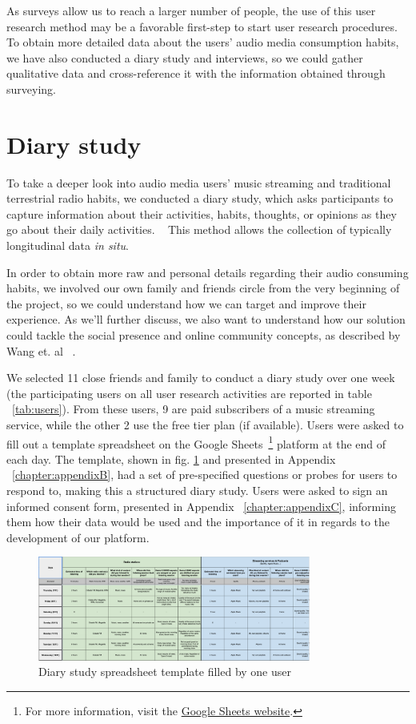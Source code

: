 As surveys allow us to reach a larger number of people, the use of this user research method may be a favorable first-step to start user research procedures. To obtain more detailed data about the users' audio media consumption habits, we have also conducted a diary study and interviews, so we could gather qualitative data and cross-reference it with the information obtained through surveying.

\section{Diary study}

To take a deeper look into audio media users' music streaming and traditional terrestrial radio habits, we conducted a diary study, which asks participants to capture information about their activities, habits, thoughts, or opinions as they go about their daily activities. ~\cite{Courage2005} This method allows the collection of typically longitudinal data \textit{in situ}. 

In order to obtain more raw and personal details regarding their audio consuming habits, we involved our own family and friends circle from the very beginning of the project, so we could understand how we can target and improve their experience. As we'll further discuss, we also want to understand how our solution could tackle the social presence and online community concepts, as described by Wang et. al ~\cite{Wang2014}.

We selected 11 close friends and family to conduct a diary study over one week (the participating users on all user research activities are reported in table ~\ref{tab:users}). From these users, 9 are paid subscribers of a music streaming service, while the other 2 use the free tier plan (if available). Users were asked to fill out a template spreadsheet on the Google Sheets~\footnote{For more information, visit the \href{http://sheets.google.com/}{Google Sheets website}.} platform at the end of each day. The template, shown in fig. \ref{fig:diarystudy} and presented in Appendix ~\ref{chapter:appendixB}, had a set of pre-specified questions or probes for users to respond to, making this a structured diary study. Users were asked to sign an informed consent form, presented in Appendix ~\ref{chapter:appendixC}, informing them how their data would be used and the importance of it in regards to the development of our platform.


\begin{figure}[h]
\centering
\includegraphics[width=0.8\textwidth]{./Images/diarystudy.png}
\caption{Diary study spreadsheet template filled by one user}
\label{fig:diarystudy}
\end{figure}


